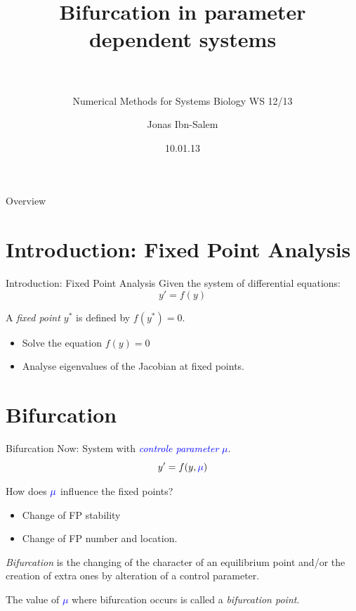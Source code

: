 \documentclass{beamer}
\title[Bifurcation]{Bifurcation in parameter dependent systems\\~\\}
\subtitle{Numerical Methods for Systems Biology WS 12/13}
\author[Jonas Ibn-Salem]{Jonas Ibn-Salem}
\institute[]{}
\date{10.01.13}
\begin{document}
\maketitle


\begin{frame}{Overview}
    \tableofcontents
\end{frame}

\section{Introduction: Fixed Point Analysis}
\begin{frame}{Introduction: Fixed Point Analysis}
    Given the system of differential equations:
    $$y' = f(y) $$
    \begin{definition}
        A \emph{fixed point $y^*$} is defined by $f(y^*)=0$.
    \end{definition}
    \begin{itemize}
        \item Solve the equation $f(y) = 0$ 
        \item Analyse eigenvalues of the Jacobian at fixed points.
    \end{itemize}
\end{frame}
\section{Bifurcation}

\begin{frame}{Bifurcation}
    Now: System with \textcolor{blue}{\emph{controle parameter} $\mu$}. 
    $$y' = f(y, \textcolor{blue}{\mu})$${}    

    \begin{block}{}
        How does $\textcolor{blue}{\mu}$ influence the fixed points?
    \end{block}

    \pause
    \begin{itemize}
        \item Change of FP stability
        \item Change of FP number and location.
    \end{itemize}
    
    \pause
    \begin{definition}
        \emph{Bifurcation} is the changing of the character of an equilibrium 
        point and/or the creation of extra ones by alteration of a control parameter.
    \end{definition}

    The value of \textcolor{blue}{$\mu$} where bifurcation occurs is called a \emph{bifurcation point}.
\end{frame}
\end{document}
